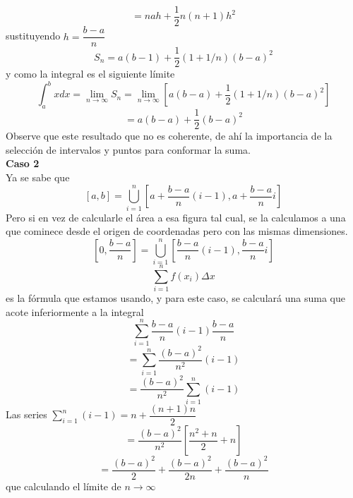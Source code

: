 \documentclass[10pt,twoside]{SelfArx} %
\begin{document}
\begin{ejemplo}
	\begin{equation}
=nah+\dfrac{1}{2}n(n+1)h^{2}	
	\end{equation}
	sustituyendo $ h=\dfrac{b-a}{n} $
	\begin{equation}
	S_{n}=a(b-1)+\dfrac{1}{2}(1+1/n)(b-a)^{2}
	\end{equation}
	y como la integral es el siguiente límite
	\begin{equation}
	\int_{a}^{b}xdx=\lim\limits_{n\rightarrow\infty}S_{n}=\lim\limits_{n\rightarrow\infty}\left [a(b-a)+\dfrac{1}{2}(1+1/n)(b-a)^{2}\right]
	\end{equation}
	\begin{equation}
	=a(b-a)+\dfrac{1}{2}(b-a)^{2}
	\end{equation}
	Observe que este resultado que no es coherente, de ahí la importancia de la selección de intervalos y puntos para conformar la suma.\\
	\textbf{Caso 2}\\
	Ya se sabe que 
	\[ [a,b]=\bigcup_{i=1}^{n}\left [a+\dfrac{b-a}{n}(i-1),a+\dfrac{b-a}{n}i\right ] \]
	Pero si en vez de calcularle el área a esa figura tal cual, se la calculamos a una que cominece desde el origen de coordenadas pero con las mismas dimensiones.
\[ 	\left [0,\dfrac{b-a}{n}\right ]=\bigcup_{i=1}^{n}\left [\dfrac{b-a}{n}(i-1),\dfrac{b-a}{n}i\right ] \]
\begin{equation}
\sum_{i=1}^{n}f(x_{i})\Delta x
\end{equation}
es la f\'ormula  que estamos usando, y para este caso, se calculará una suma que acote inferiormente a la integral
\begin{equation}
\sum_{i=1}^{n}\dfrac{b-a}{n}(i-1)\dfrac{b-a}{n}
\end{equation}
\begin{equation}
=\sum_{i=1}^{n}\dfrac{(b-a)^{2}}{n^{2}}(i-1)
\end{equation}
\begin{equation}
=\dfrac{(b-a)^{2}}{n^{2}}\sum_{i=1}^{n}(i-1)
\end{equation}
Las series $ \sum_{i=1}^{n}(i-1)=n+\dfrac{(n+1)n}{2} $
\begin{equation}
=\dfrac{(b-a)^{2}}{n^{2}}\left [\dfrac{n^{2}+n}{2}+n\right ]
\end{equation}
\begin{equation}
=\dfrac{(b-a)^{2}}{2}+\dfrac{(b-a)^{2}}{2n}+\dfrac{(b-a)^{2}}{n}
\end{equation}
que calculando el límite de $ n\rightarrow\infty $
\begin{equation}

\end{equation}
\end{ejemplo}
\end{document}
